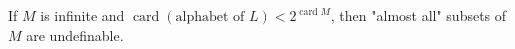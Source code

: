 If $M$ is infinite and $\operatorname{card}(\text{alphabet of } L) < 2^{\operatorname{card} M}$, then "almost all" subsets of $M$ are undefinable.
